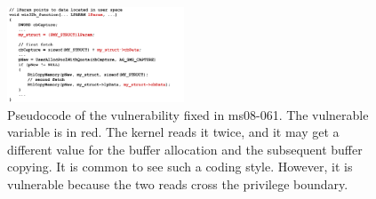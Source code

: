 

%
%


\begin{figure}[th]
	\includegraphics[width=0.47\textwidth]{figures/code08061}
	\centering
	\caption{Pseudocode of the vulnerability fixed in ms08-061. The vulnerable variable is in red. The kernel reads it twice, and it may get a different value for the buffer allocation and the subsequent buffer copying. It is common to see such a coding style. However, it is vulnerable because the two reads cross the privilege boundary.}
	\label{fig:code08061}
\end{figure}



